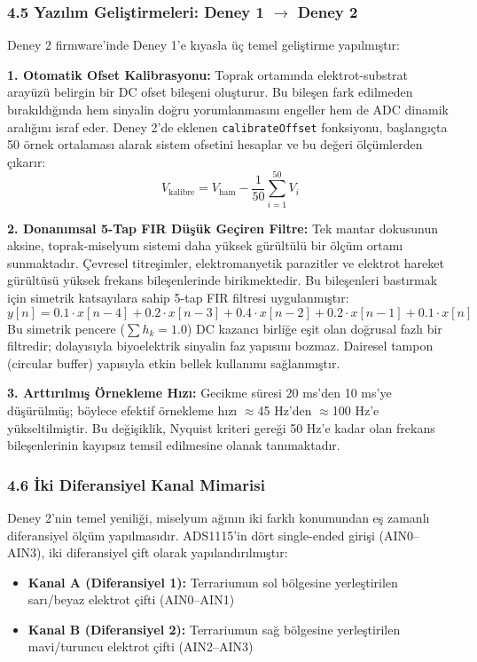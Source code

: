 \documentclass[11pt,a4paper]{article}
\begin{document}
\subsubsection*{4.5 Yazılım Geliştirmeleri: Deney 1 $\rightarrow$ Deney 2}

Deney 2 firmware'inde Deney 1'e kıyasla üç temel geliştirme yapılmıştır:

\textbf{1. Otomatik Ofset Kalibrasyonu:} Toprak ortamında elektrot-substrat arayüzü belirgin bir DC ofset bileşeni oluşturur. Bu bileşen fark edilmeden bırakıldığında hem sinyalin doğru yorumlanmasını engeller hem de ADC dinamik aralığını israf eder. Deney 2'de eklenen \texttt{calibrateOffset} fonksiyonu, başlangıçta 50 örnek ortalaması alarak sistem ofsetini hesaplar ve bu değeri ölçümlerden çıkarır:
$$V_{\text{kalibre}} = V_{\text{ham}} - \frac{1}{50}\sum_{i=1}^{50} V_i$$

\textbf{2. Donanımsal 5-Tap FIR Düşük Geçiren Filtre:} Tek mantar dokusunun aksine, toprak-miselyum sistemi daha yüksek gürültülü bir ölçüm ortamı sunmaktadır. Çevresel titreşimler, elektromanyetik parazitler ve elektrot hareket gürültüsü yüksek frekans bileşenlerinde birikmektedir. Bu bileşenleri bastırmak için simetrik katsayılara sahip 5-tap FIR filtresi uygulanmıştır:
$$y[n] = 0.1 \cdot x[n-4] + 0.2 \cdot x[n-3] + 0.4 \cdot x[n-2] + 0.2 \cdot x[n-1] + 0.1 \cdot x[n]$$
Bu simetrik pencere ($\sum h_k = 1.0$) DC kazancı birliğe eşit olan doğrusal fazlı bir filtredir; dolayısıyla biyoelektrik sinyalin faz yapısını bozmaz. Dairesel tampon (circular buffer) yapısıyla etkin bellek kullanımı sağlanmıştır.

\textbf{3. Arttırılmış Örnekleme Hızı:} Gecikme süresi 20 ms'den 10 ms'ye düşürülmüş; böylece efektif örnekleme hızı $\approx$45 Hz'den $\approx$100 Hz'e yükseltilmiştir. Bu değişiklik, Nyquist kriteri gereği 50 Hz'e kadar olan frekans bileşenlerinin kayıpsız temsil edilmesine olanak tanımaktadır.

\subsubsection*{4.6 İki Diferansiyel Kanal Mimarisi}

Deney 2'nin temel yeniliği, miselyum ağının iki farklı konumundan eş zamanlı diferansiyel ölçüm yapılmasıdır. ADS1115'in dört single-ended girişi (AIN0--AIN3), iki diferansiyel çift olarak yapılandırılmıştır:
\begin{itemize}[leftmargin=1cm]
  \item \textbf{Kanal A (Diferansiyel 1):} Terrariumun sol bölgesine yerleştirilen sarı/beyaz elektrot çifti (AIN0--AIN1)
  \item \textbf{Kanal B (Diferansiyel 2):} Terrariumun sağ bölgesine yerleştirilen mavi/turuncu elektrot çifti (AIN2--AIN3)
\end{itemize}
\end{document}
